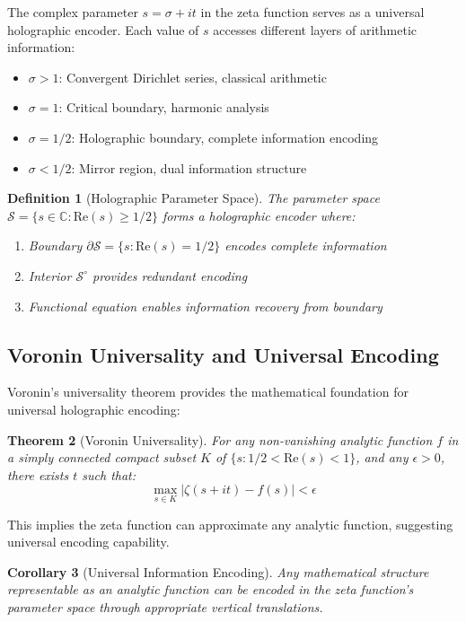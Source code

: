 \documentclass[12pt]{article}
\newtheorem{theorem}{Theorem}[section]
\newtheorem{corollary}[theorem]{Corollary}
\newtheorem{definition}[theorem]{Definition}
\begin{document}
The complex parameter $s = \sigma + it$ in the zeta function serves as a universal holographic encoder. Each value of $s$ accesses different layers of arithmetic information:

\begin{itemize}
\item $\sigma > 1$: Convergent Dirichlet series, classical arithmetic
\item $\sigma = 1$: Critical boundary, harmonic analysis
\item $\sigma = 1/2$: Holographic boundary, complete information encoding
\item $\sigma < 1/2$: Mirror region, dual information structure
\end{itemize}

\begin{definition}[Holographic Parameter Space]
The parameter space $\mathcal{S} = \{s \in \mathbb{C} : \text{Re}(s) \geq 1/2\}$ forms a holographic encoder where:
\begin{enumerate}
\item Boundary $\partial\mathcal{S} = \{s : \text{Re}(s) = 1/2\}$ encodes complete information
\item Interior $\mathcal{S}^\circ$ provides redundant encoding
\item Functional equation enables information recovery from boundary
\end{enumerate}
\end{definition}

\subsection{Voronin Universality and Universal Encoding}

Voronin's universality theorem provides the mathematical foundation for universal holographic encoding:

\begin{theorem}[Voronin Universality]
For any non-vanishing analytic function $f$ in a simply connected compact subset $K$ of $\{s : 1/2 < \text{Re}(s) < 1\}$, and any $\epsilon > 0$, there exists $t$ such that:
$$\max_{s \in K} |\zeta(s + it) - f(s)| < \epsilon$$
\end{theorem}

This implies the zeta function can approximate any analytic function, suggesting universal encoding capability.

\begin{corollary}[Universal Information Encoding]
Any mathematical structure representable as an analytic function can be encoded in the zeta function's parameter space through appropriate vertical translations.
\end{corollary}
\end{document}
